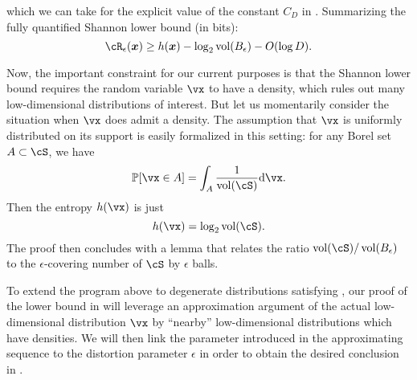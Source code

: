 \documentclass[../../book-main.tex]{subfiles}
\begin{document}
which we can take for the explicit value of the constant $C_D$ in .
Summarizing the fully quantified Shannon lower bound (in bits):
\begin{equation}\label{eq:slb-appendix}
    \cR_{\epsilon}(\x)
    \geq
    h(\x)
    - \log_2 \volume(B_{\epsilon})
    - O(\log D).
\end{equation}

Now, the important constraint for our current purposes is that the Shannon lower
bound requires the random variable $\vx$ to have a density, which rules out many
low-dimensional distributions of interest.
But let us momentarily consider the situation when $\vx$ does admit a density.
The assumption that $\vx$ is uniformly distributed on its support is easily
formalized in this setting: for any Borel set $A \subset \cS$, we have
\begin{equation}
    \Pr[\vx \in A] = \int_{A} \frac{1}{\volume(\cS)} \odif \vx.
\end{equation}
Then the entropy $h(\vx)$ is just
\begin{equation}
    h(\vx) = \log_2 \volume(\cS).
\end{equation}
The proof then concludes with a lemma that relates the ratio $\volume(\cS)
/ \volume(B_{\epsilon})$ to the $\epsilon$-covering number of $\cS$ by
$\epsilon$ balls.


To extend the program above to degenerate distributions satisfying
,
our proof of the lower bound in  will
leverage an approximation argument of the actual low-dimensional
distribution $\vx$ by ``nearby'' low-dimensional distributions which have
densities.
We will then link the parameter introduced in
the approximating sequence to the distortion parameter $\epsilon$ in order to
obtain the desired conclusion in .
\end{document}
